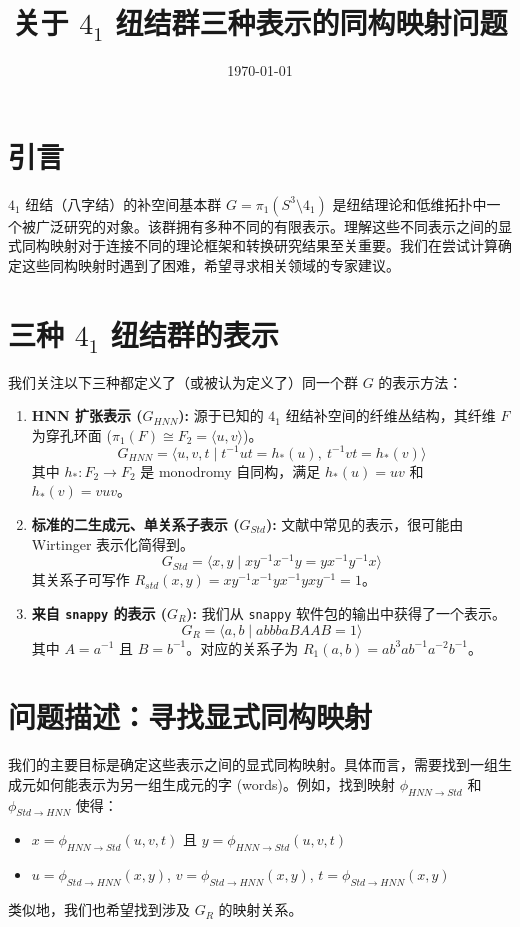 \documentclass[12pt, a4paper]{article}
\title{关于 $4_1$ 纽结群三种表示的同构映射问题}
\date{\today} %
\begin{document}
\maketitle

\section{引言}
$4_1$ 纽结（八字结）的补空间基本群 $G = \pi_1(S^3 \setminus 4_1)$ 是纽结理论和低维拓扑中一个被广泛研究的对象。该群拥有多种不同的有限表示。理解这些不同表示之间的显式同构映射对于连接不同的理论框架和转换研究结果至关重要。我们在尝试计算确定这些同构映射时遇到了困难，希望寻求相关领域的专家建议。

\section{三种 $4_1$ 纽结群的表示}
我们关注以下三种都定义了（或被认为定义了）同一个群 $G$ 的表示方法：

\begin{enumerate}
    \item \textbf{HNN 扩张表示 ($G_{HNN}$):} 源于已知的 $4_1$ 纽结补空间的纤维丛结构，其纤维 $F$ 为穿孔环面 ($\pi_1(F) \cong F_2 = \langle u, v \rangle$)。
    \[
    G_{HNN} = \langle u, v, t \mid t^{-1}ut = h_*(u), \ t^{-1}vt = h_*(v) \rangle
    \]
    其中 $h_*: F_2 \to F_2$ 是 monodromy 自同构，满足 $h_*(u)=uv$ 和 $h_*(v)=vuv$。

    \item \textbf{标准的二生成元、单关系子表示 ($G_{Std}$):} 文献中常见的表示，很可能由 Wirtinger 表示化简得到。
    \[
    G_{Std} = \langle x, y \mid xy^{-1}x^{-1}y = yx^{-1}y^{-1}x \rangle
    \]
    其关系子可写作 $R_{std}(x,y) = xy^{-1}x^{-1}y x^{-1} y x y^{-1} = 1$。

    \item \textbf{来自 \texttt{snappy} 的表示 ($G_R$):} 我们从 \texttt{snappy} 软件包的输出中获得了一个表示。
    \[
    G_R = \langle a, b \mid abbbaBAAB = 1 \rangle
    \]
    其中 $A=a^{-1}$ 且 $B=b^{-1}$。对应的关系子为 $R_1(a,b) = ab^3ab^{-1}a^{-2}b^{-1}$。
\end{enumerate}

\section{问题描述：寻找显式同构映射}
我们的主要目标是确定这些表示之间的显式同构映射。具体而言，需要找到一组生成元如何能表示为另一组生成元的字 (words)。例如，找到映射 $\phi_{HNN \to Std}$ 和 $\phi_{Std \to HNN}$ 使得：
\begin{itemize}
    \item $x = \phi_{HNN \to Std}(u, v, t)$ 且 $y = \phi_{HNN \to Std}(u, v, t)$
    \item $u = \phi_{Std \to HNN}(x, y)$, $v = \phi_{Std \to HNN}(x, y)$, $t = \phi_{Std \to HNN}(x, y)$
\end{itemize}
类似地，我们也希望找到涉及 $G_R$ 的映射关系。
\end{document}
